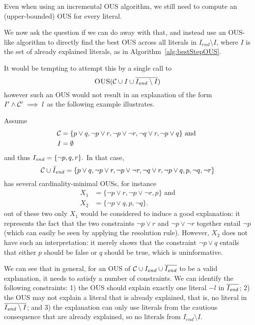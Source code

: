 Even when using an incremental OUS algorithm, we still need to compute an (upper-bounded) OUS for every literal.

We now ask the question if we can do away with that, and instead use an OUS-like algorithm to directly find the best OUS across all literals in $I_{end} \setminus I$, where $I$ is the set of already explained literals, as in Algorithm~\ref{alg:bestStepOUS}. 

It would be tempting to attempt this by a single call to 
\[\textsc{OUS}(\mathcal{C}  \cup I \cup \overline{I_{\mathit{end}}\setminus I})\]
however such an OUS would not result in an explanation of the form $I' \wedge \mathcal{C} ' \implies l$ as the following example illustrates. 
\begin{example}
Assume \begin{align*}
         \mathcal{C}  &= \{p\lor q, \lnot p \lor r, \lnot p \lor \lnot r, \lnot q\lor r, \lnot p \lor q \}\text{ and }\\
         I &= \emptyset
       \end{align*}
       and thus
$         I_{\mathit{end}} = \{ \lnot p, q, r\}.$
In that case, 
\[\mathcal{C} \cup \bar{I}_{\mathit{end}} = \{p\lor q, \lnot p \lor r, \lnot p \lor \lnot r, \lnot q\lor r, \lnot p \lor q , p,\lnot q,\lnot r \}\]
has several cardinality-minimal OUSs, for instance 
\begin{align*}
X_1 &=    \{\lnot p \lor r, \lnot p \lor \lnot r, p\}\text{ and}\\
X_2 &= \{\lnot p \lor q ,  p, \lnot q\}.
\end{align*}
out of these two only $X_1$ would be considered to induce a good explanation: it represents the fact that the two constraints $\lnot p \lor r$ and $ \lnot p \lor \lnot r$ together entail $\lnot p$ (which can easily be seen by applying the resolution rule). However, $X_2$ does not have such an interpretation: it merely shows that the constraint $\lnot p \lor q$ entails that either $p$ should be false or $q$ should be true, which is uninformative. 
\end{example}

We can see that in general, for an OUS of $\mathcal{C}  \cup I_{end} \cup \overline{I_{\mathit{end}}}$ to be a valid explanation, it needs to satisfy a number of constraints. %
We can identify the following constraints: 1) the OUS should explain exactly one literal $-l$ in $\overline{I_{\mathit{end}}}$; 2) the OUS may not explain a literal that is already explained, that is, no literal in $\overline{I_{\mathit{end}} \setminus I}$; and 3) the explanation can only use literals from the cautious consequence that are already explained, so no literals from $I_{end} \setminus I$.

